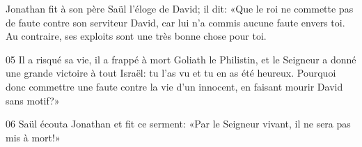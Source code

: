 Jonathan fit à son père Saül l’éloge de David; il dit: «Que le roi ne commette pas de faute contre son serviteur David, car lui n’a commis aucune faute envers toi. Au contraire, ses exploits sont une très bonne chose pour toi.

05 Il a risqué sa vie, il a frappé à mort Goliath le Philistin, et le Seigneur a donné une grande victoire à tout Israël: tu l’as vu et tu en as été heureux. Pourquoi donc commettre une faute contre la vie d’un innocent, en faisant mourir David sans motif?»

06 Saül écouta Jonathan et fit ce serment: «Par le Seigneur vivant, il ne sera pas mis à mort!»